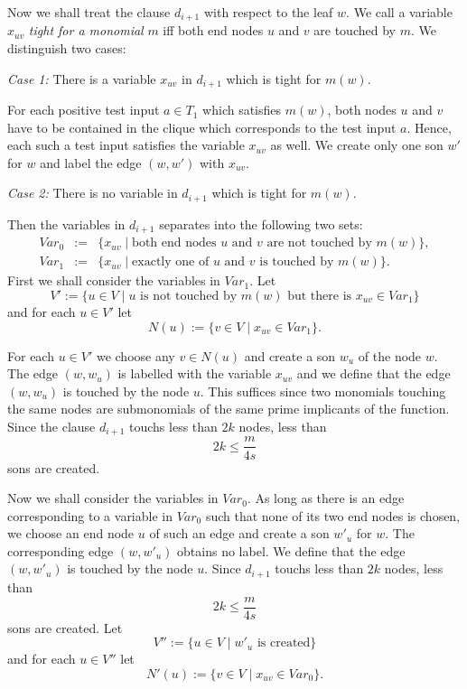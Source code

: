 \documentclass[11pt]{article}
\begin{document}
Now we shall treat the clause $d_{i+1}$ with respect to the leaf $w$. We call a variable $x_{uv}$
{\em tight for a monomial\/} $m$ iff both end nodes $u$ and $v$ are touched by $m$. We distinguish two cases:

\smallskip
\noindent
{\em Case 1:\/} There is a variable $x_{uv}$ in $d_{i+1}$ which is tight for $m(w)$.

\smallskip
For each positive test input $a \in T_1$ which satisfies $m(w)$, both nodes $u$ and $v$ have to be contained in
the clique
which corresponds to the test input $a$. Hence, each such a test input satisfies the variable $x_{uv}$ as well. We
create only one son $w'$ for $w$ and label the edge $(w,w')$ with $x_{uv}$.

\smallskip
\noindent
{\em Case 2:\/} There is no variable in $d_{i+1}$ which is tight for $m(w)$.

\smallskip
Then the variables in $d_{i+1}$ separates into the following two sets:
$$
\begin{array}{lll}
Var_0 &:=& \{x_{uv} \mid \mbox{both end nodes $u$ and $v$ are not touched by } m(w)\}, \\
Var_1 &:=& \{x_{uv} \mid \mbox{exactly one of $u$ and $v$ is touched by } m(w)\}.
\end{array}
$$
First we shall consider the variables in $Var_1$. Let
$$
V' := \{u \in V \mid u \mbox{ is not touched by $m(w)$ but there is $x_{uv} \in Var_1$}\}
$$
and for each $u \in V'$ let
$$
N(u) := \{v \in V \mid x_{uv} \in Var_1\}.
$$

For each $u \in V'$ we choose any $v \in N(u)$ and create a son $w_u$ of the node $w$. The edge $(w,w_u)$ is
labelled with the variable $x_{uv}$ and we define that the edge $(w,w_u)$ is touched by the node $u$. 
This suffices since two monomials touching the same nodes are submonomials of 
the same prime implicants of the function.
Since the clause $d_{i+1}$ touchs less than $2k$ nodes, less than
$$
2k \leq \frac{m}{4s}
$$
sons are created.

Now we shall consider the variables in $Var_0$. As long as there is an edge corresponding to a variable in
$Var_0$ such that none of its two end nodes is chosen, we choose an end node $u$ of such an edge and create a son
$w'_u$ for $w$. The corresponding edge $(w,w'_u)$ obtains no label. We define that the edge $(w,w'_u)$ is touched
by the node $u$. Since $d_{i+1}$ touchs less than $2k$ nodes, less than
$$
2k \leq \frac{m}{4s}
$$
sons are created. Let
$$
V'' := \{u \in V \mid w'_u \mbox{ is created}\}
$$
and for each $u \in V''$ let
$$
N'(u) := \{v \in V \mid x_{uv} \in Var_0\}.
$$
\end{document}
